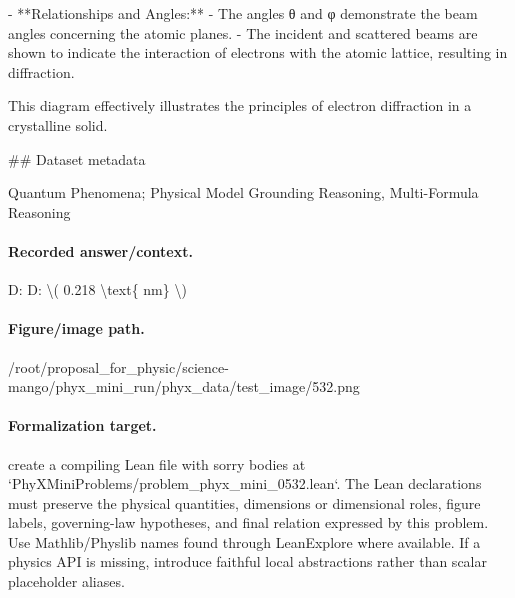 - **Relationships and Angles:**
  - The angles θ and φ demonstrate the beam angles concerning the atomic planes.
  - The incident and scattered beams are shown to indicate the interaction of electrons with the atomic lattice, resulting in diffraction.

This diagram effectively illustrates the principles of electron diffraction in a crystalline solid.

\#\# Dataset metadata

Quantum Phenomena; Physical Model Grounding Reasoning, Multi-Formula Reasoning

\paragraph{Recorded answer/context.}
D: D: \textbackslash{}( 0.218 \textbackslash{}text\{ nm\} \textbackslash{})

\paragraph{Figure/image path.}
/root/proposal\_for\_physic/science-mango/phyx\_mini\_run/phyx\_data/test\_image/532.png

\paragraph{Formalization target.}
create a compiling Lean file with sorry bodies at `PhyXMiniProblems/problem\_phyx\_mini\_0532.lean`. The Lean declarations must preserve the physical quantities, dimensions or dimensional roles, figure labels, governing-law hypotheses, and final relation expressed by this problem.
Use Mathlib/Physlib names found through LeanExplore where available. If a physics API is missing, introduce faithful local abstractions rather than scalar placeholder aliases.

